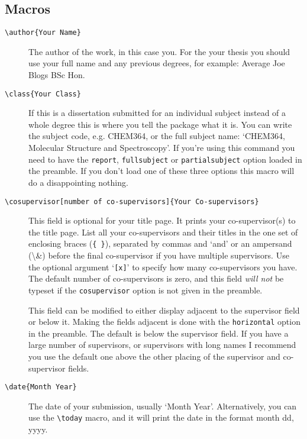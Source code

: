 \documentclass[12pt,oneside]{article}
\newcommand{\option}[1]{\texttt{\color{Green}#1}} %
\newcommand{\command}[1]{\texttt{\color{Red}#1}} %
\newcommand{\comoptions}[1]{\texttt{\color{Blue}#1}} %
\begin{document}
\subsection*{Macros}
\begin{description}
    \item[\command{\textbackslash{}author}\comoptions{\{Your Name\}}]
    The author of the work, in this case you. For the your thesis you should use your full name and any previous degrees, for example: Average Joe Blogs BSc Hon.
    
    \item[\command{\textbackslash{}class}\comoptions{\{Your Class\}}] If this is a dissertation submitted for an individual subject instead of a whole degree this is where you tell the package what it is. You can write the subject code, e.g. CHEM364, or the full subject name: `CHEM364, Molecular Structure and Spectroscopy'. If you're using this command you need to have the \option{report}, \option{fullsubject} or \option{partialsubject} option loaded in the preamble. If you don't load one of these three options this macro will do a disappointing nothing.
    
    \item[\command{\textbackslash{}cosupervisor}\option{[number of co-supervisors]}\comoptions{\{Your Co-supervisors\}}] This field is optional for your title page. It prints your co-super\-visor(s) to the title page. List all your co-supervisors and their titles in the one set of enclosing braces (\comoptions{\{~\}}), separated by commas and `and' or an ampersand (\textbackslash{}\&) before the final co-supervisor if you have multiple supervisors. Use the optional argument `\option{[x]}' to specify how many co-supervisors you have. The default number of co-supervisors is zero, and this field \emph{will not} be typeset if the \option{cosupervisor} option is not given in the preamble. 
    
    This field can be modified to either display adjacent to the supervisor field or below it. Making the fields adjacent is done with the \option{horizontal} option in the preamble. The default is below the supervisor field. If you have a large number of supervisors, or supervisors with long names I recommend you use the default one above the other placing of the supervisor and co-supervisor fields.
    
    \item[\command{\textbackslash{}date}\comoptions{\{Month Year\}}] The date of your submission, usually `Month Year'. Alternatively, you can use the \command{\textbackslash{}today} macro, and it will print the date in the format month dd, yyyy.
    

\end{description}
\end{document}
